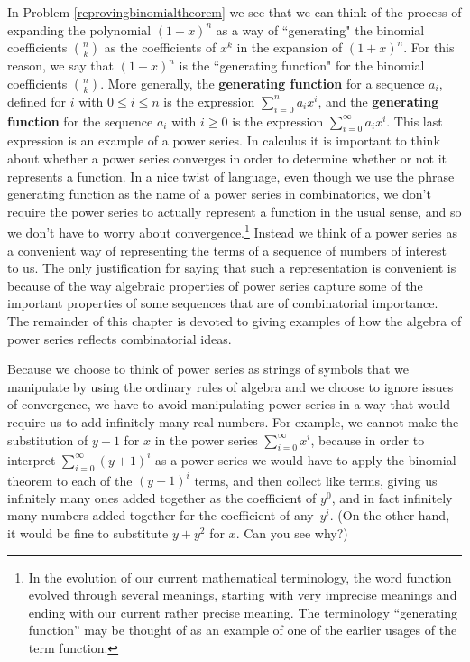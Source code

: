 \ep
In Problem \ref{reprovingbinomialtheorem} we see that we can think of the
process of expanding the polynomial $(1+x)^n$ as a way of ``generating"
the binomial coefficients $n\choose k$ as the coefficients of $x^k$ in the
expansion of $(1+x)^n$.  For this reason, we say that $(1+x)^n$ is the
``generating function" for the binomial coefficients $n\choose k$.  More
generally, the {\bf generating function} for a sequence $a_i$, defined for
$i$ with $0\le i\le n$ is the expression $\sum_{i=0}^n a_ix^i$, and the
{\bf generating function} for the sequence
$a_i$ with $i\ge 0$ is the expression $\sum_{i=0}^\infty a_ix^i$.  This
last expression is an example of a power series.  In calculus it is
important to think about whether a power series converges in order to
determine whether or not it represents a function.  In a nice twist of
language, even though we use the phrase generating function as the name
of a power series in combinatorics, we don't require the power series to
actually represent a function in the usual sense, and so we don't have to
worry about convergence.\footnote{In the evolution of our current
mathematical terminology, the word function evolved through several
meanings, starting with  very imprecise meanings and ending with our
current rather precise meaning.  The terminology ``generating function''
may be thought of as an example of one of the earlier usages of the term
function.}  Instead we think of a power series as a convenient way of
representing the terms of a sequence of numbers of interest to us.  The
only justification for saying that such a representation is convenient is
because of the way algebraic properties of power series capture some of
the important properties of some sequences that are of combinatorial
importance.  The remainder of this chapter
is devoted to giving examples of how the algebra of power series reflects
combinatorial ideas.  

Because we choose to think of power series  as strings of symbols that we
manipulate by using the ordinary rules of algebra and we choose to ignore
issues of convergence, we have to avoid manipulating power series in a way that
would require us to add infinitely many real numbers.  For example, we
cannot make the substitution of $y+1$ for
$x$ in the power series $\sum_{i=0}^\infty x^i$, because in order to
interpret $\sum_{i=0}^\infty (y+1)^i$ as a power series we would have to
apply the binomial theorem to each of the $(y+1)^i$ terms, and then
collect like terms, giving us infinitely many ones added together as the
coefficient of
$y^0$, and in fact infinitely many numbers added together for the
coefficient of any~$y^i$.  (On the other hand, it would be fine to
substitute $y+y^2$ for $x$.  Can you see why?)

